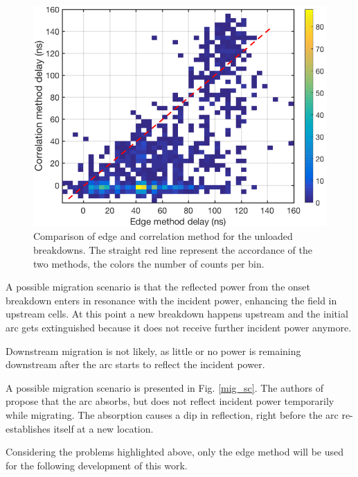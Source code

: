 \begin{figure}[p]
\centering 
\includegraphics[scale=0.5]{pictures/metods_comparison_2.png}
\caption{Comparison of edge and correlation method for the unloaded breakdowns. The straight red line represent the accordance of the two methods, the colors the number of counts per bin. }
\label{comp_corr_edge}
\end{figure}


A possible migration scenario is that the reflected power from the onset breakdown enters in resonance with the incident power, enhancing the field in upstream cells. At this point a new breakdown happens upstream and the initial arc gets extinguished because it does not receive further incident power anymore. 

Downstream migration is not likely, as little or no power is remaining downstream after the arc starts to reflect the incident power. 

A possible migration scenario is presented in Fig.  \ref{mig_sc}. The authors of \cite{Degiovanni:migration} propose that the arc absorbs, but does not reflect incident power temporarily while migrating. The absorption causes a dip in reflection, right before the arc re-establishes itself at a new location.



Considering the problems highlighted above, only the edge method will be used for the following development of this work.

